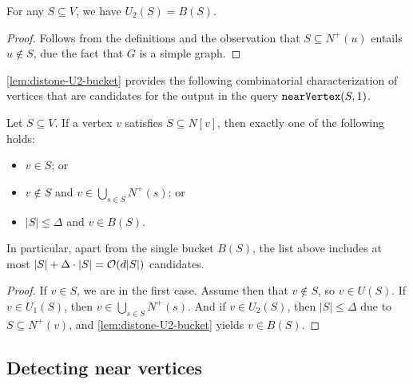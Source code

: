 \begin{lemma}\label{lem:distone-U2-bucket}
For any $S\subseteq V$, we have $U_2(S)=B(S)$.
\end{lemma}
\begin{proof}
	Follows from the definitions and the observation that $S\subseteq N^+(u)$ entails $u\notin S$, due the fact that $G$ is a simple graph.
\end{proof}

\cref{lem:distone-U2-bucket} provides the following combinatorial characterization of vertices that are candidates for the output in the query $\mathtt{nearVertex}(S,1)$.

\begin{lemma}\label{cl:distone-near-candidates}
Let $S\subseteq V$.
If a vertex $v$ satisfies $S\subseteq N[v]$, then exactly one of the following holds:
\begin{itemize}
\item $v\in S$; or
\item $v \not\in S$ and $v\in \bigcup_{s\in S}N^+(s)$; or
\item $|S|\le \Delta$ and $v\in B(S)$.
\end{itemize}
In particular, apart from the single bucket $B(S)$, the list above includes at most $|S|+\Delta\cdot |S|=\mathcal{O}(d|S|)$ candidates.
\end{lemma}
\begin{proof}
If $v\in S$, we are in the first case.
Assume then that $v\notin S$, so $v\in U(S)$.
If $v\in U_1(S)$, then $v\in \bigcup_{s\in S}N^+(s)$.
And if $v\in U_2(S)$, then $|S|\leq \Delta$ due to $S\subseteq N^+(v)$, and \cref{lem:distone-U2-bucket} yields $v\in B(S)$.
\end{proof}

\subsection{Detecting near vertices}\label{sec:distone-near}

